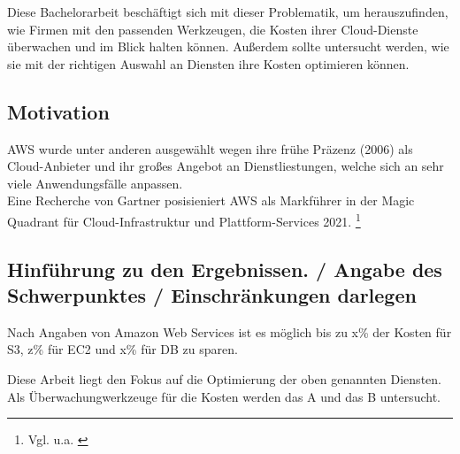 Diese Bachelorarbeit beschäftigt sich mit dieser Problematik, um herauszufinden, wie Firmen mit den passenden Werkzeugen, die Kosten ihrer Cloud-Dienste überwachen und im Blick halten können. Außerdem sollte untersucht werden, wie sie mit der richtigen Auswahl an Diensten ihre Kosten optimieren können.
\newpage
\subsection{Motivation}
AWS wurde unter anderen ausgewählt wegen ihre frühe Präzenz (2006) als Cloud-Anbieter und ihr großes
Angebot an Dienstliestungen, welche sich an sehr viele Anwendungsfälle anpassen.
\\
Eine Recherche von Gartner posisieniert AWS als Markführer in der Magic Quadrant für Cloud-Infrastruktur und Plattform-Services 2021.
\footnote{Vgl. u.a. \cite{G01}}


\subsection{Hinführung zu den Ergebnissen. / Angabe des Schwerpunktes / Einschränkungen darlegen}
Nach Angaben von Amazon Web Services ist es möglich bis zu x\% der Kosten für S3, z\% für EC2 und x\% für DB zu sparen.


Diese Arbeit liegt den Fokus auf die Optimierung der oben genannten Diensten.
Als Überwachungwerkzeuge für die Kosten werden das A und das B untersucht. 
\\
